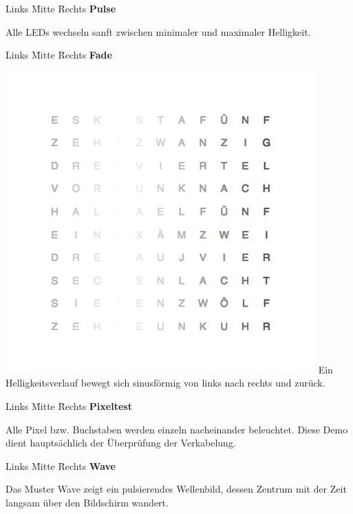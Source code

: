 \begin{multicols}{2}
\begin{tabbing}  
 Links \= Mitte \= Rechts \kill
 \> \textbf{Pulse}
\end{tabbing}

Alle LEDs wechseln sanft zwischen minimaler und maximaler Helligkeit.

\begin{tabbing}  
 Links \= Mitte \= Rechts \kill
 \> \textbf{Fade}
\end{tabbing}

{
    \centering
    \includegraphics[width=\columnwidth]{Abbildungen/Software/Demo/Fade}
}
Ein Helligkeitsverlauf bewegt sich sinusförmig von links nach rechts und zurück.

\begin{tabbing}  
 Links \= Mitte \= Rechts \kill
 \> \textbf{Pixeltest}
\end{tabbing}

Alle Pixel bzw. Buchstaben werden einzeln nacheinander beleuchtet. Diese Demo dient hauptsächlich der Überprüfung der Verkabelung. 

\begin{tabbing}  
 Links \= Mitte \= Rechts \kill
 \> \textbf{Wave}
\end{tabbing}

Das Muster Wave zeigt ein pulsierendes Wellenbild, dessen Zentrum mit der Zeit langsam über den Bildschirm wandert.


\end{multicols}
